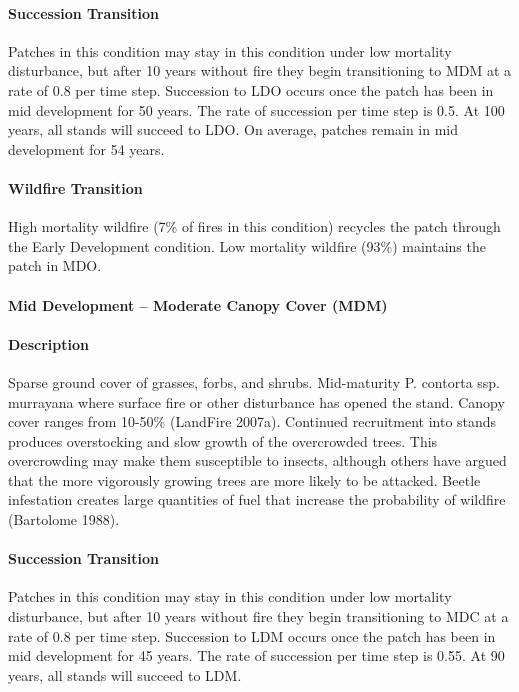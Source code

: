 \paragraph{Succession Transition} Patches in this condition may stay in this condition under low mortality disturbance, but after 10 years without fire they begin transitioning to MDM at a rate of 0.8 per time step. Succession to LDO occurs once the patch has been in mid development for 50 years. The rate of succession per time step is 0.5. At 100 years, all stands will succeed to LDO. On average, patches remain in mid development for 54 years.

\paragraph{Wildfire Transition} High mortality wildfire (7\% of fires in this condition) recycles the patch through the Early Development condition. Low mortality wildfire (93\%) maintains the patch in MDO.

\noindent\hrulefill

\paragraph{Mid Development – Moderate Canopy Cover (MDM)}

\paragraph{Description} Sparse ground cover of grasses, forbs, and shrubs. Mid-maturity P. contorta ssp. murrayana where surface fire or other disturbance has opened the stand. Canopy cover ranges from 10-50\% (LandFire 2007a).
Continued recruitment into stands produces overstocking and slow growth of the overcrowded trees. This overcrowding may make them susceptible to insects, although others have argued that the more vigorously growing trees are more likely to be attacked. Beetle infestation creates large quantities of fuel that increase the probability of wildfire (Bartolome 1988).


\paragraph{Succession Transition} Patches in this condition may stay in this condition under low mortality disturbance, but after 10 years without fire they begin transitioning to MDC at a rate of 0.8 per time step. Succession to LDM occurs once the patch has been in mid development for 45 years. The rate of succession per time step is 0.55. At 90 years, all stands will succeed to LDM.

